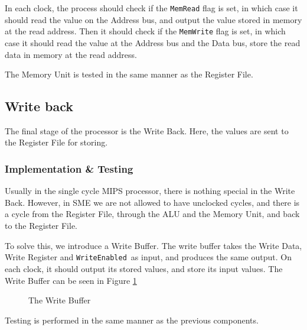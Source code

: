In each clock, the process should check if the \texttt{MemRead} flag is set, in
which case it should read the value on the Address bus, and output the value
stored in memory at the read address. Then it should check if the
\texttt{MemWrite} flag is set, in which case it should read the value at the
Address bus and the Data bus, store the read data in memory at the read
address.

The Memory Unit is tested in the same manner as the Register File.

\subsection{Write back}
The final stage of the processor is the Write Back. Here, the values are sent
to the Register File for storing.

\subsubsection*{Implementation \& Testing}
Usually in the single cycle MIPS processor, there is nothing special in the
Write Back. However, in SME we are not allowed to have unclocked cycles, and
there is a cycle from the Register File, through the ALU and the Memory Unit,
and back to the Register File.

To solve this, we introduce a Write Buffer. The write buffer takes the Write
Data, Write Register and \texttt{WriteEnabled} as input, and produces the same
output. On each clock, it should output its stored values, and store its input
values. The Write Buffer can be seen in Figure \ref{fig:wb}
\begin{figure}
    \centering
    \caption{The Write Buffer}
    \label{fig:wb}
\end{figure}

Testing is performed in the same manner as the previous components.
